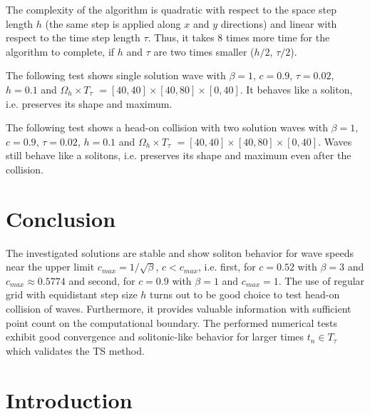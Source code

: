 \documentclass[11pt,a4paper,twoside]{article}
\begin{document}
The complexity of the algorithm is quadratic with respect to the space step length $h$ (the same step is applied along $x$ and $y$ directions) and linear with respect to the time step length $\tau$. Thus, it takes 8 times more time for the algorithm to complete, if $h$ and $\tau$ are two times smaller ($h/2$, $\tau/2$).

The following test shows single solution wave with $\beta = 1$, $c = 0.9$, $\tau = 0.02$, $h = 0.1$ and $\Omega_h \times T_{\tau}$ $= [40, 40] \times [40, 80] \times [0, 40]$. It behaves like a soliton, i.e. preserves its shape and maximum.

The following test shows a head-on collision with two solution waves with $\beta = 1$, $c = 0.9$, $\tau = 0.02$, $h = 0.1$ and $\Omega_h \times T_{\tau}$ $= [40, 40] \times [40, 80] \times [0, 40]$. Waves still behave like a solitons, i.e. preserves its shape and maximum even after the collision.

\section{Conclusion}\label{Concl}

The investigated solutions are stable and show soliton behavior for wave speeds near the upper limit $c_{max} = 1/\sqrt{\beta}$, $c < c_{max}$, i.e. first, for $c = 0.52$ with $\beta = 3$ and $c_{max} \approx 0.5774$ and second, for  $c = 0.9$ with $\beta = 1$ and $c_{max} = 1$. The use of regular grid with equidistant step size $h$ turns out to be good choice to test head-on collision of waves. Furthermore, it provides valuable information with sufficient point count on the computational boundary. The performed numerical tests exhibit good convergence and solitonic-like behavior for larger times $t_n \in T_{\tau}$ which validates the TS method. 

\section{Introduction}
\end{document}
